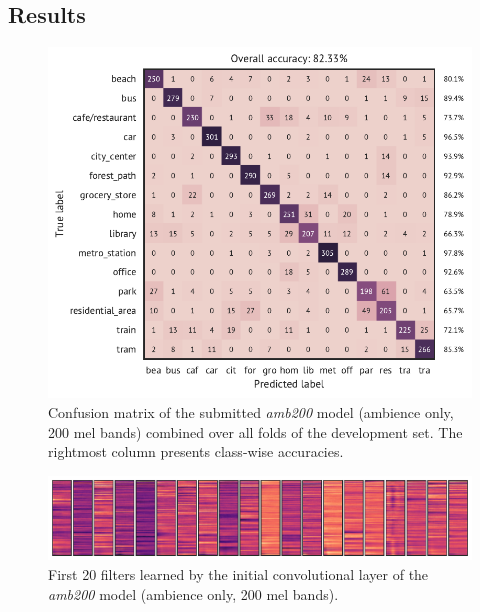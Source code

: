 \documentclass{article}
\begin{document}
\begin{sloppy}
\vspace{-6pt}

\section{Results}

\begin{figure}[t]
  \centering
  \centerline{\includegraphics[width=\columnwidth]{figures/run_200_th_0_5.pdf}}
  \vspace{-6pt}
  \caption{Confusion matrix of the submitted \textit{amb200} model (ambience only, 200 mel bands) combined over all folds of the development set. The rightmost column presents class-wise accuracies.}
  \label{fig:confusion}
  \vspace{-8pt}
\end{figure}

\begin{figure}[b]
  \vspace{-6pt}
  \centering
  \centerline{\includegraphics[width=\columnwidth]{figures/conv1_filters.pdf}}
  \caption{First 20 filters learned by the initial convolutional layer of the \textit{amb200} model (ambience only, 200 mel bands).}
  \label{fig:conv1_filters}
\end{figure}


\end{sloppy}
\end{document}
